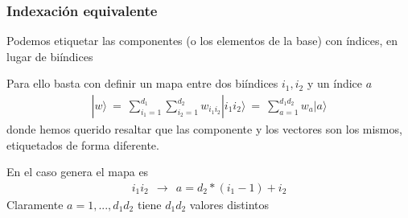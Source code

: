 \documentclass[letterpaper,10pt,english]{jupyterBook}
\newcommand{\ket}[1]{|#1\rangle}
\begin{document}
\subsubsection{Indexación equivalente}
\label{\detokenize{docs/Part_01_Formalismo/Chapter_01_02_Formalismo_matem_xe1tico/01_04_Tensores_myst:indexacion-equivalente}}
\sphinxAtStartPar
Podemos etiquetar las componentes (o los elementos de la base) con índices, en lugar de bi\sphinxhyphen{}índices

\sphinxAtStartPar
Para ello basta con definir un mapa  entre dos bi\sphinxhyphen{}índices \(i_1,i_2\) y un índice \(a\)
\begin{equation*}
\begin{split}
\ket{w} ~= ~ \sum_{i_1=1}^{d_1}\sum_{i_2=1}^{d_2} w_{i_1 i_2} \ket{i_1 i_2} ~=~ \sum_{a=1}^{d_1d_2} w_{a} \ket{a}
\end{split}
\end{equation*}
\sphinxAtStartPar
donde hemos querido resaltar que las componente y  los vectores son los mismos, etiquetados de forma diferente.

\sphinxAtStartPar
En el caso genera el mapa es
\begin{equation*}
\begin{split}
i_1 i_2 ~~\to ~~ a = d_2*(i_1-1) + i_2
\end{split}
\end{equation*}
\sphinxAtStartPar
Claramente \(a = 1,...,d_1d_2\) tiene \(d_1d_2\) valores distintos

\sphinxAtStartPar
\end{document}
